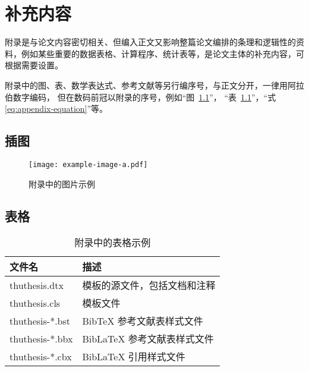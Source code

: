 
\chapter{补充内容}

附录是与论文内容密切相关、但编入正文又影响整篇论文编排的条理和逻辑性的资料，例如某些重要的数据表格、计算程序、统计表等，是论文主体的补充内容，可根据需要设置。

附录中的图、表、数学表达式、参考文献等另行编序号，与正文分开，一律用阿拉伯数字编码，
但在数码前冠以附录的序号，例如“图~\ref{fig:appendix-figure}”，
“表~\ref{tab:appendix-table}”，“式\eqref{eq:appendix-equation}”等。


\section{插图}


\begin{figure}
  \centering
  \texttt{[image: example-image-a.pdf]}
  \caption{附录中的图片示例}
  \label{fig:appendix-figure}
\end{figure}


\section{表格}




\begin{table}
  \centering
  \caption{附录中的表格示例}
  \begin{tabular}{ll}
    \toprule
    文件名          & 描述                         \\
    \midrule
    thuthesis.dtx   & 模板的源文件，包括文档和注释 \\
    thuthesis.cls   & 模板文件                     \\
    thuthesis-*.bst & BibTeX 参考文献表样式文件    \\
    thuthesis-*.bbx & BibLaTeX 参考文献表样式文件  \\
    thuthesis-*.cbx & BibLaTeX 引用样式文件        \\
    \bottomrule
  \end{tabular}
  \label{tab:appendix-table}
\end{table}


